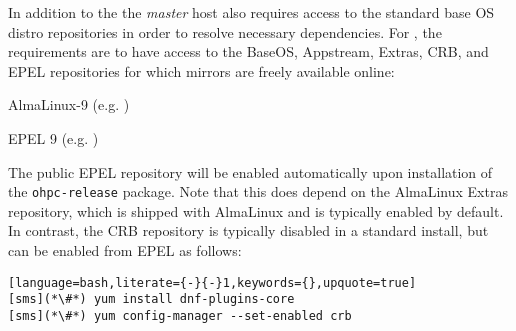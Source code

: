 In addition to the \OHPC{}
\iftoggle{isxCAT}{and \xCAT{} package repositories,}{package repository,}
the {\em master} host also requires access to the standard base OS distro
repositories in order to resolve necessary dependencies. For \baseOS{}, the
requirements are to have access to the BaseOS, Appstream, Extras, CRB,
and EPEL repositories for which mirrors are freely available online:

\begin{itemize*}
\item AlmaLinux-9
  (e.g. \href{https://repo.almalinux.org/almalinux/9/}
             {\color{blue}{https://repo.almalinux.org/almalinux/9/}} )
\item EPEL 9 (e.g. \href{http://download.fedoraproject.org/pub/epel/9/}
                        {\color{blue}{http://download.fedoraproject.org/pub/epel/9/}} )
\end{itemize*}

\noindent The public EPEL repository will be enabled automatically upon
installation of the \texttt{ohpc-release} package. Note that this does depend
on the AlmaLinux Extras repository, which is shipped with AlmaLinux and is typically
enabled by default.  In contrast, the CRB repository is typically
disabled in a standard install, but can be enabled from EPEL as follows:

\begin{lstlisting}[language=bash,literate={-}{-}1,keywords={},upquote=true]
[sms](*\#*) yum install dnf-plugins-core
[sms](*\#*) yum config-manager --set-enabled crb
\end{lstlisting}
